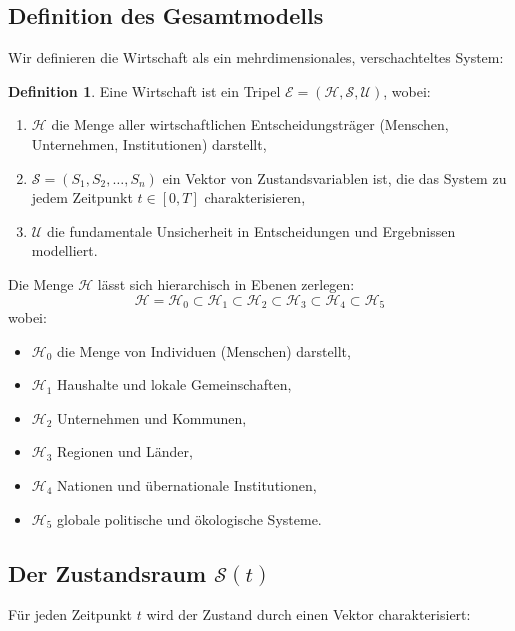 \documentclass[a4paper, 12pt, twoside, openright]{report}
\theoremstyle{definition}
\newtheorem{definition}[theorem]{Definition}
\theoremstyle{definition}
\begin{document}
\subsection{Definition des Gesamtmodells}

Wir definieren die Wirtschaft als ein mehrdimensionales, verschachteltes System:

\begin{definition}
\label{def:wirtschaft-system}
Eine Wirtschaft ist ein Tripel $\mathcal{E} = (\mathcal{H}, \mathcal{S}, \mathcal{U})$, wobei:
\begin{enumerate}
\item $\mathcal{H}$ die Menge aller wirtschaftlichen Entscheidungsträger (Menschen, Unternehmen, Institutionen) darstellt,
\item $\mathcal{S} = (S_1, S_2, \ldots, S_n)$ ein Vektor von Zustandsvariablen ist, die das System zu jedem Zeitpunkt $t \in [0,T]$ charakterisieren,
\item $\mathcal{U}$ die fundamentale Unsicherheit in Entscheidungen und Ergebnissen modelliert.
\end{enumerate}
\end{definition}

Die Menge $\mathcal{H}$ lässt sich hierarchisch in Ebenen zerlegen:
\begin{equation}
\mathcal{H} = \mathcal{H}_0 \subset \mathcal{H}_1 \subset \mathcal{H}_2 \subset \mathcal{H}_3 \subset \mathcal{H}_4 \subset \mathcal{H}_5
\end{equation}
wobei:
\begin{itemize}
\item $\mathcal{H}_0$ die Menge von Individuen (Menschen) darstellt,
\item $\mathcal{H}_1$ Haushalte und lokale Gemeinschaften,
\item $\mathcal{H}_2$ Unternehmen und Kommunen,
\item $\mathcal{H}_3$ Regionen und Länder,
\item $\mathcal{H}_4$ Nationen und übernationale Institutionen,
\item $\mathcal{H}_5$ globale politische und ökologische Systeme.
\end{itemize}

\subsection{Der Zustandsraum $\mathcal{S}(t)$}

Für jeden Zeitpunkt $t$ wird der Zustand durch einen Vektor charakterisiert:
\end{document}
